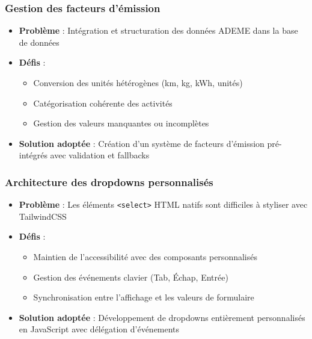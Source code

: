 \documentclass[a4paper,11pt]{article}
\begin{document}
            \subsubsection{Gestion des facteurs d'émission}
                \begin{itemize}
                    \item \textbf{Problème} : Intégration et structuration des données ADEME dans la base de données
                    \item \textbf{Défis} : 
                        \begin{itemize}
                            \item Conversion des unités hétérogènes (km, kg, kWh, unités)
                            \item Catégorisation cohérente des activités
                            \item Gestion des valeurs manquantes ou incomplètes
                        \end{itemize}
                    \item \textbf{Solution adoptée} : Création d'un système de facteurs d'émission pré-intégrés avec validation et fallbacks
                \end{itemize}

            \subsubsection{Architecture des dropdowns personnalisés}
                \begin{itemize}
                    \item \textbf{Problème} : Les éléments \texttt{<select>} HTML natifs sont difficiles à styliser avec TailwindCSS
                    \item \textbf{Défis} :
                        \begin{itemize}
                            \item Maintien de l'accessibilité avec des composants personnalisés
                            \item Gestion des événements clavier (Tab, Échap, Entrée)
                            \item Synchronisation entre l'affichage et les valeurs de formulaire
                        \end{itemize}
                    \item \textbf{Solution adoptée} : Développement de dropdowns entièrement personnalisés en JavaScript avec délégation d'événements
                \end{itemize}
\end{document}
